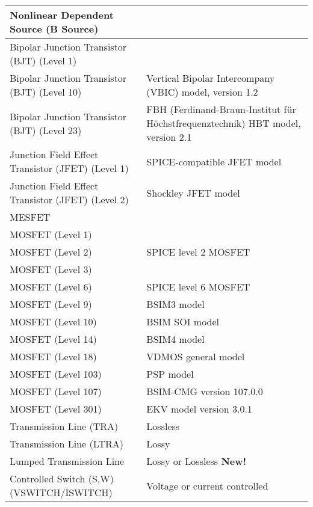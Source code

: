 \begin{longtable}[h] {>{\raggedright\small}m{2in}|>{\raggedright\let\\\tabularnewline\small}m{3.5in}}
    Nonlinear Dependent Source  (B Source) & \\ \hline

    Bipolar Junction Transistor (BJT) (Level 1)&  \\ \hline

    Bipolar Junction Transistor (BJT) (Level 10)& 
Vertical Bipolar Intercompany (VBIC) model, version 1.2 \\ \hline

    Bipolar Junction Transistor (BJT) (Level 23)& 
FBH (Ferdinand-Braun-Institut f\"ur H\"ochstfrequenztechnik) HBT model, version 2.1 \\ \hline

    Junction Field Effect Transistor (JFET) (Level 1)  &  
SPICE-compatible JFET model\\ \hline
    Junction Field Effect Transistor (JFET) (Level 2) &  
Shockley JFET model\\ \hline

    MESFET &  \\ \hline

    MOSFET (Level 1) &  \\ \hline
    MOSFET (Level 2) &  SPICE level 2 MOSFET \\ \hline
    MOSFET (Level 3) &  \\ \hline
    MOSFET (Level 6) &  SPICE level 6 MOSFET \\ \hline
    MOSFET (Level 9) &  BSIM3 model \\ \hline
    MOSFET (Level 10) & BSIM SOI model \\ \hline
    MOSFET (Level 14) & BSIM4 model \\ \hline
    MOSFET (Level 18) &  VDMOS general model \\ \hline
    MOSFET (Level 103) & PSP model \\ \hline
    MOSFET (Level 107)  & BSIM-CMG version 107.0.0 \\ \hline
    MOSFET (Level 301)& EKV model version 3.0.1 \\ \hline

    Transmission Line (TRA) &  Lossless \\ \hline
    Transmission Line (LTRA) &  Lossy  \\ \hline
    Lumped Transmission Line &  Lossy or Lossless {\color{red}\textbf{New!}} \\ \hline

    Controlled Switch (S,W) (VSWITCH/ISWITCH) & Voltage or current controlled\\ \hline


\end{longtable}
